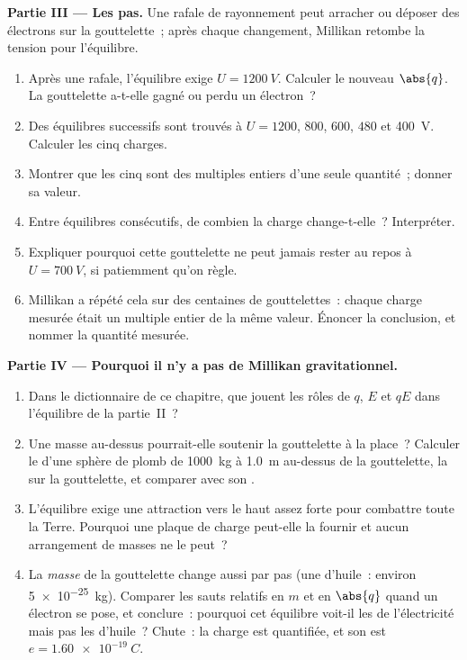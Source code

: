 \begin{problem}
\medskip
\noindent\textbf{Partie III --- Les pas.}
Une rafale de rayonnement peut arracher ou déposer des électrons sur la
gouttelette~; après chaque changement, Millikan retombe la
tension pour l'équilibre.
\begin{enumerate}[resume]
  \item Après une rafale, l'équilibre exige $U = \qty{1200}{V}$. Calculer
        le nouveau $\abs{q}$. La gouttelette a-t-elle gagné ou perdu un
        électron~?
  \item Des équilibres successifs sont trouvés à $U = 1200$, $800$,
        $600$, $480$ et \qty{400}{V}. Calculer les cinq charges.
  \item Montrer que les cinq sont des multiples entiers d'une seule
        quantité~; donner sa valeur.
  \item Entre équilibres consécutifs, de combien la charge change-t-elle~?
        Interpréter.
  \item Expliquer pourquoi cette gouttelette ne peut jamais rester au
        repos à $U = \qty{700}{V}$, si patiemment qu'on règle.
  \item Millikan a répété cela sur des centaines de gouttelettes~: chaque
        charge mesurée était un multiple entier de la même valeur.
        Énoncer la conclusion, et nommer la quantité mesurée.
\end{enumerate}

\medskip
\noindent\textbf{Partie IV --- Pourquoi il n'y a pas de Millikan
gravitationnel.}
\begin{enumerate}[resume]
  \item Dans le dictionnaire de ce chapitre, que jouent les rôles de
        $q$, $E$ et $qE$ dans l'équilibre de la partie~II~?
  \item Une masse au-dessus pourrait-elle soutenir la gouttelette à la
        place~? Calculer le
         d'une sphère de plomb
        de \qty{1000}{kg} à \qty{1.0}{m} au-dessus de la gouttelette, la
         sur la gouttelette, et comparer
        avec son .
  \item L'équilibre exige une attraction vers le haut assez forte pour
        combattre toute la Terre. Pourquoi une plaque de charge peut-elle
        la fournir et aucun arrangement de masses ne le peut~?
  \item La \emph{masse} de la gouttelette change aussi par pas (une
         d'huile~: environ
        \qty{5e-25}{kg}). Comparer les sauts relatifs en $m$ et en
        $\abs{q}$ quand un électron se pose, et conclure~: pourquoi cet
        équilibre voit-il les
         de l'électricité mais
        pas les  d'huile~?
        Chute~: la charge est quantifiée, et son
         est
        $e = \qty{1.60e-19}{C}$.
\end{enumerate}
\end{problem}
